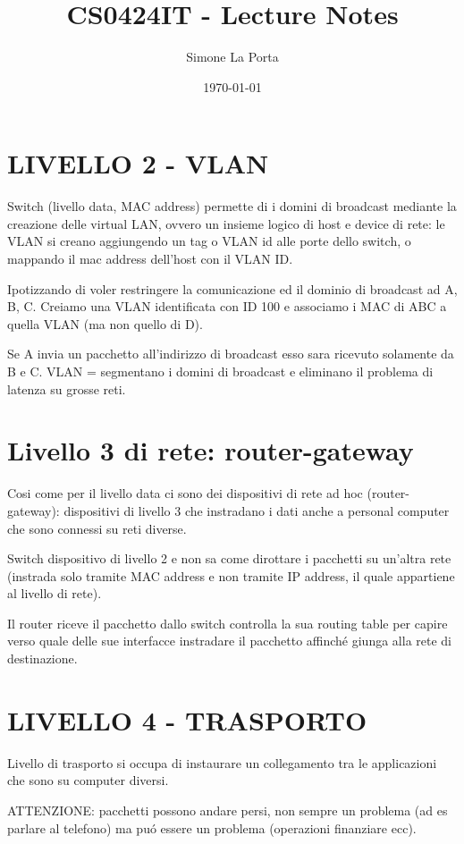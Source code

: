 \documentclass{article}
\title{CS0424IT - Lecture Notes} %
\author{Simone La Porta} %
\date{\today}
\begin{document}
\maketitle
\tableofcontents
\newpage
\section{LIVELLO 2 - VLAN}

Switch (livello data, MAC address) permette di  i domini di broadcast mediante la creazione delle virtual LAN, ovvero un insieme logico di host e device di rete: le VLAN si creano aggiungendo un tag o VLAN id alle porte dello switch, o mappando il mac address dell'host con il VLAN ID.

Ipotizzando di voler restringere la comunicazione ed il dominio di broadcast ad A, B, C. Creiamo una VLAN identificata con ID 100 e associamo i MAC di ABC a quella VLAN (ma non quello di D).

Se A invia un pacchetto all'indirizzo di broadcast esso sara ricevuto solamente da B e C. VLAN = segmentano i domini di broadcast e eliminano il problema di latenza su grosse reti.

\section{Livello 3 di rete: router-gateway}

Cosi come per il livello data ci sono dei dispositivi di rete ad hoc (router-gateway): dispositivi di livello 3 che instradano i dati anche a personal computer che sono connessi su reti diverse.

Switch dispositivo di livello 2 e non sa come dirottare i pacchetti su un'altra rete (instrada solo tramite MAC address e non tramite IP address, il quale appartiene al livello di rete).

Il router riceve il pacchetto dallo switch controlla la sua routing table per capire verso quale delle sue interfacce instradare il pacchetto affinché giunga alla rete di destinazione.

\section{LIVELLO 4 - TRASPORTO}

Livello di trasporto si occupa di instaurare un collegamento tra le applicazioni che sono su computer diversi.

ATTENZIONE: pacchetti possono andare persi, non sempre un problema (ad es parlare al telefono) ma puó essere un problema (operazioni finanziare ecc).
\end{document}
